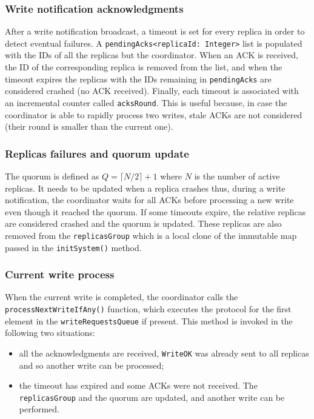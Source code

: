 \subsubsection{Write notification acknowledgments}

After a write notification broadcast, a timeout is set for every replica in order to detect eventual failures. A \texttt{pendingAcks<replicaId: Integer>} list is populated with the IDs of all the replicas but the coordinator. When an ACK is received, the ID of the corresponding replica is removed from the list, and when the timeout expires the replicas with the IDs remaining in \texttt{pendingAcks} are considered crashed (no ACK received). Finally, each timeout is associated with an incremental counter called \texttt{acksRound}. This is useful because, in case the coordinator is able to rapidly process two writes, stale ACKs are not considered (their round is smaller than the current one).

\subsubsection{Replicas failures and quorum update}

The quorum is defined as $Q = \lceil N / 2 \rceil + 1$ where $N$ is the number of active replicas. It needs to be updated when a replica crashes thus, during a write notification, the coordinator waits for all ACKs before processing a new write even though it reached the quorum. If some timeouts expire, the relative replicas are considered crashed and the quorum is updated. These replicas are also removed from the \texttt{replicasGroup} which is a local clone of the immutable map passed in the \texttt{initSystem()} method.

\subsubsection{Current write process}

When the current write is completed, the coordinator calls the \texttt{processNextWriteIfAny()} function, which executes the protocol for the first element in the \texttt{writeRequestsQueue} if present. This method is invoked in the following two situations:

\begin{itemize}
\item all the acknowledgments are received, \texttt{WriteOK} was already sent to all replicas and so another write can be processed;

\item the timeout has expired and some ACKs were not received. The \texttt{replicasGroup} and the quorum are updated, and another write can be performed.
\end{itemize}

